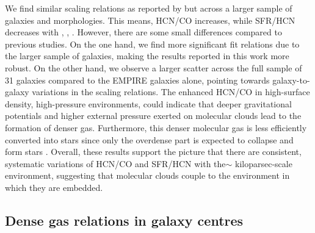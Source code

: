 \documentclass[letter, longauth]{aa} %
\begin{document}
We find similar scaling relations as reported by \citet{Jimenez-Donaire2019} but across a larger sample of galaxies and morphologies.
This means, HCN/CO increases, while SFR/HCN decreases with \sigstar, \sigmol, \pde.
However, there are some small differences compared to previous studies.
On the one hand, we find more significant fit relations due to the larger sample of galaxies, making the results reported in this work more robust.
On the other hand, we observe a larger scatter across the full sample of 31 galaxies compared to the EMPIRE galaxies alone, pointing towards galaxy-to-galaxy variations in the scaling relations.
The enhanced HCN/CO in high-surface density, high-pressure environments, could indicate that deeper gravitational potentials and higher external pressure exerted on molecular clouds lead to the formation of denser gas.
Furthermore, this denser molecular gas is less efficiently converted into stars since only the overdense part is expected to collapse and form stars \citep[based on turbulent cloud models, e.g., ][]{Krumholz2005}.
Overall, these results support the picture that there are consistent, systematic variations of HCN/CO and SFR/HCN with the$\sim$ kiloparsec-scale environment, suggesting that molecular clouds couple to the environment in which they are embedded.


\subsection{Dense gas relations in galaxy centres}
\end{document}
